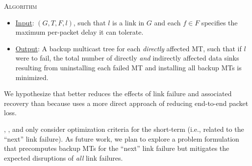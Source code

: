\md \textsc{Algorithm}
\begin{itemize}
	
	\item  \underline{Input}: $(G,T,F,l)$, such that $l$ is a link in $G$ and each $f \in F$ specifies the maximum per-packet delay it can tolerate.

	\item \underline{Output}:  A backup multicast tree for each \emph{directly} affected MT, such that if $l$ were to fail, the total number of directly \emph{and} indirectly affected data sinks resulting from 
		uninstalling each failed MT and installing all backup MTs is minimized.

\end{itemize}
\vspace{-0.3cm}
We hypothesize that \md better reduces the effects of link failure and associated recovery than \mf because \md uses a more direct approach of reducing end-to-end packet loss.


{\bf \bigpic}

\mcs, \mfs, and \md only consider optimization criteria for the short-term (i.e., related to the ``next'' link failure).  As future work, we plan to explore a 
\bigpic problem formulation that precomputes backup MTs for the ``next'' link failure but mitigates the expected disruptions of \emph{all} link failures.  



